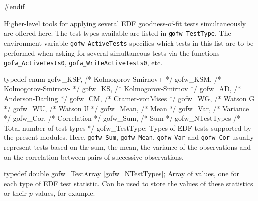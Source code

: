 #endif
\endcode

\fi %



Higher-level tools for applying several EDF goodness-of-fit tests
simultaneously are offered here.
The test types available are listed in {\tt gofw\_TestType}.
The environment variable {\tt gofw\_ActiveTests} specifies which
tests in this list are to be performed when asking for several
simultaneous tests via the functions {\tt gofw\_ActiveTests0},
{\tt gofw\_WriteActiveTests0}, etc.


\code

typedef enum {
   gofw_KSP,                      /* Kolmogorov-Smirnov+        */
   gofw_KSM,                      /* Kolmogorov-Smirnov-        */
   gofw_KS,                       /* Kolmogorov-Smirnov         */
   gofw_AD,                       /* Anderson-Darling           */
   gofw_CM,                       /* Cramer-vonMises            */
   gofw_WG,                       /* Watson G                   */
   gofw_WU,                       /* Watson U                   */
   gofw_Mean,                     /* Mean                       */
   gofw_Var,                      /* Variance                   */
   gofw_Cor,                      /* Correlation                */
   gofw_Sum,                      /* Sum                        */
   gofw_NTestTypes                /* Total number of test types */
   } gofw_TestType;
\endcode
 \tab  Types of EDF tests supported by the present modules.
  Here,  {\tt gofw\_Sum}, {\tt gofw\_Mean}, {\tt gofw\_Var} and {\tt gofw\_Cor}
  usually represent tests based on the sum, the mean, the variance of the
 observations and on the correlation between pairs of successive observations.
 \endtab
\code


typedef double gofw_TestArray [gofw_NTestTypes];
\endcode
 \tab Array of values, one for each type of EDF test statistic.
  Can be used to store the values of these statistics or their
  $p$-values, for example.
 \endtab
\code


